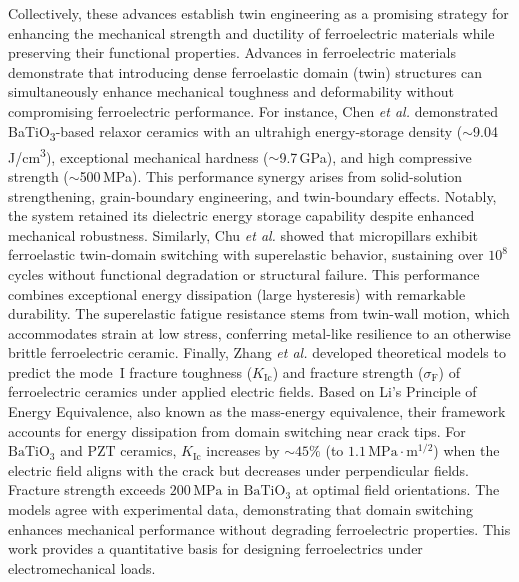 \documentclass[a4paper,fleqn]{cas-sc}
\begin{document}
\par Collectively, these advances establish twin engineering as a promising strategy for enhancing the mechanical strength and ductility of ferroelectric materials while preserving their functional properties. Advances in ferroelectric materials demonstrate that introducing dense ferroelastic domain (twin) structures can simultaneously enhance mechanical toughness and deformability without compromising ferroelectric performance. For instance, Chen \textit{et al.} \cite{he2022morphologies} demonstrated BaTiO\textsubscript{3}-based relaxor ceramics with an ultrahigh energy-storage density ($\sim$9.04\,J/cm\textsuperscript{3}), exceptional mechanical hardness ($\sim$9.7\,GPa), and high compressive strength ($\sim$500\,MPa). This performance synergy arises from solid-solution strengthening, grain-boundary engineering, and twin-boundary effects. Notably, the system retained its dielectric energy storage capability despite enhanced mechanical robustness. Similarly, Chu \textit{et al.} \cite{chu2023superelastic} showed that  micropillars exhibit ferroelastic twin-domain switching with superelastic behavior, sustaining over \(10^8\) cycles without functional degradation or structural failure. This performance combines exceptional energy dissipation (large hysteresis) with remarkable durability. The superelastic fatigue resistance stems from twin-wall motion, which accommodates strain at low stress, conferring metal-like resilience to an otherwise brittle ferroelectric ceramic. Finally, Zhang \textit{et al.} \cite{zhang2025theoretical} developed theoretical models to predict the mode~I fracture toughness ($K_{\mathrm{Ic}}$) and fracture strength ($\sigma_{\mathrm{F}}$) of ferroelectric ceramics under applied electric fields. Based on Li's Principle of Energy Equivalence, also known as the mass-energy equivalence, their framework accounts for energy dissipation from domain switching near crack tips. For $\mathrm{BaTiO_3}$ and $\mathrm{PZT}$ ceramics, $K_{\mathrm{Ic}}$ increases by $\sim\!45\%$ (to $1.1\,\mathrm{MPa\cdot m^{1/2}}$) when the electric field aligns with the crack but decreases under perpendicular fields. Fracture strength exceeds $200\,\mathrm{MPa}$ in $\mathrm{BaTiO_3}$ at optimal field orientations. The models agree with experimental data, demonstrating that domain switching enhances mechanical performance without degrading ferroelectric properties. This work provides a quantitative basis for designing ferroelectrics under electromechanical loads.
\end{document}
